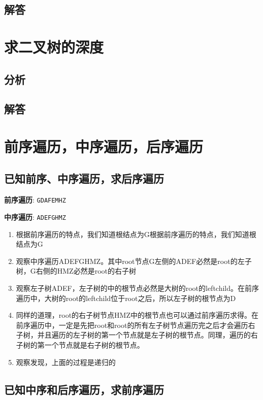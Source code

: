 \documentclass[UTF8,a4paper,12pt]{ctexbook}
\begin{document}
	\subsection{解答}
	
\section{求二叉树的深度}
	\subsection{分析}
	
	\subsection{解答}
	
\section{前序遍历，中序遍历，后序遍历}
	\subsection{已知前序、中序遍历，求后序遍历}
	
		\textbf{前序遍历}: \verb|GDAFEMHZ|
		
		\textbf{中序遍历}: \verb|ADEFGHMZ|
		
		\begin{enumerate}
			\item 根据前序遍历的特点，我们知道根结点为G根据前序遍历的特点，我们知道根结点为G
			\item 观察中序遍历ADEFGHMZ。其中root节点G左侧的ADEF必然是root的左子树，G右侧的HMZ必然是root的右子树
			\item 观察左子树ADEF，左子树的中的根节点必然是大树的root的leftchild。在前序遍历中，大树的root的leftchild位于root之后，所以左子树的根节点为D
			\item 同样的道理，root的右子树节点HMZ中的根节点也可以通过前序遍历求得。在前序遍历中，一定是先把root和root的所有左子树节点遍历完之后才会遍历右子树，并且遍历的左子树的第一个节点就是左子树的根节点。同理，遍历的右子树的第一个节点就是右子树的根节点。
			\item 观察发现，上面的过程是递归的
		\end{enumerate}
	
	\subsection{已知中序和后序遍历，求前序遍历}
	
\end{document}
